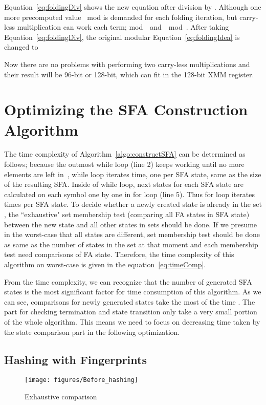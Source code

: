 \documentclass[10pt, conference, compsocconf]{IEEEtran}
\begin{document}
Equation~\eqref{eq:foldingDiv} shows the new equation after division by
. Although one more precomputed value ~mod
 is demanded for each folding iteration, but
carry-less multiplication can work each term; 
mod~~and~~mod~.
After taking Equation~\eqref{eq:foldingDiv}, the original modular
Equation~\eqref{eq:foldingIdea} is changed to


Now there are no problems with performing two carry-less
multiplications and their result will be 96-bit or 128-bit, which can fit
in the 128-bit XMM register.
\fi

\section{Optimizing the SFA Construction Algorithm}
\label{sec:optimizationSFA}



The time complexity of Algorithm~\ref{algo:constructSFA} can be determined
as follows; because the outmost while loop (line 2) keeps working until
no more elements are left in~,
while loop
iterates  time, one per SFA state, same as the size
of the resulting SFA. Inside of while loop, next states for each
SFA state are calculated on each symbol one by one in for loop (line 5). Thus
for loop iterates  times per SFA state. To decide
whether a newly created state is already in the set ,
the ``exhaustive" set membership test (comparing all FA states in SFA state)
between the new state
and all other states in sets
should be done. If we presume in the worst-case that all states are different,
set membership test should be done as same as the number of
states in the set at that moment and each membership test need
 comparisons of FA state. Therefore, the time complexity of
this algorithm on worst-case is given in the equation~\eqref{eq:timeComp}.

From the time complexity, we can recognize that the number of generated
SFA states is the most significant factor for time consumption
of this algorithm. As we can see,
comparisons for newly generated states take the
most of
the time . The part for checking termination
 and state transition  only take a very small portion of the whole algorithm. This
means we need to focus on decreasing time taken by the state comparison
part in the following optimization.

\subsection{Hashing with Fingerprints}
\iffalse
\begin{figure}[htp]
\centering
\texttt{[image: figures/Before\_hashing]}
\caption{Exhaustive comparison}
\label{fig:exComp}
\end{figure}
\end{document}
